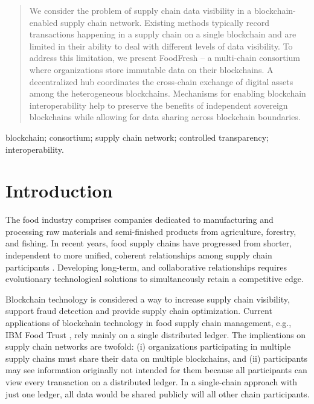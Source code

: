 \documentclass[conference,a4paper,flushend]{neutr}
\begin{document}
\selectlanguage{\NeutrLang}

\maketitle

\begin{abstract}
We consider the problem of supply chain data visibility in a blockchain-enabled supply chain network.
%
Existing methods typically record transactions happening in a supply chain on a single blockchain and are limited in their ability to deal with different levels of data visibility.
%
To address this limitation, we present FoodFresh -- a multi-chain consortium where organizations store immutable data on their blockchains.
%
A decentralized hub coordinates the cross-chain exchange of digital assets among the heterogeneous blockchains.
%
Mechanisms for enabling blockchain interoperability help to preserve the benefits of independent sovereign blockchains while allowing for data sharing across blockchain boundaries.
\end{abstract}

\begin{IEEEkeywords}
blockchain; consortium; supply chain network; controlled transparency; interoperability.
\end{IEEEkeywords}


\section{Introduction} \label{s:introduction}
The food industry comprises companies dedicated to manufacturing and processing raw materials and semi-finished products from agriculture, forestry, and fishing. In recent years, food supply chains have progressed from shorter, independent to more unified, coherent relationships among supply chain participants \cite{bourlakis2008food}. Developing long-term, and collaborative relationships requires evolutionary technological solutions to simultaneously retain a competitive edge. 

Blockchain technology is considered a way to increase supply chain visibility, support fraud detection and provide supply chain optimization. Current applications of blockchain technology in food supply chain management, e.g., IBM Food Trust \cite{ibmFoodTrust2019}, rely mainly on a single distributed ledger. The implications on supply chain networks are twofold: (i) organizations participating in multiple supply chains must share their data on multiple blockchains, and (ii) participants may see information originally not intended for them because all participants can view every transaction on a distributed ledger. In a single-chain approach with just one ledger, all data would be shared publicly will all other chain participants.
\end{document}

